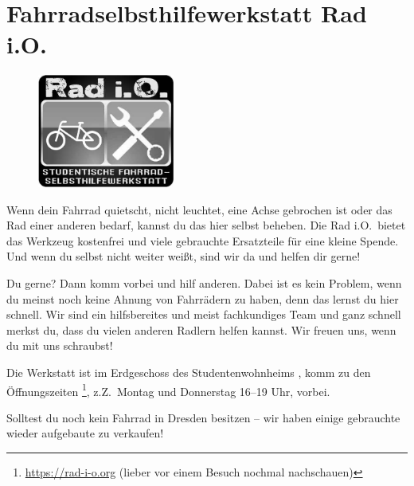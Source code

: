 \section*{Fahrradselbsthilfewerkstatt Rad i.O.}
\begin{figure}%
  \includegraphics[width=0.4\textwidth]{./radio-logo-gray.jpg}
\end{figure}
%
Wenn dein Fahrrad quietscht, nicht leuchtet, eine Achse gebrochen ist oder das Rad einer anderen  bedarf, kannst du das hier selbst beheben.
Die Rad i.O.\ bietet das Werkzeug kostenfrei und viele gebrauchte Ersatzteile für eine kleine Spende.
Und wenn du selbst nicht weiter weißt, sind wir da und helfen dir gerne!

Du  gerne? Dann komm vorbei und hilf anderen.
Dabei ist es kein Problem, wenn du meinst noch keine Ahnung von Fahrrädern zu haben,
denn das lernst du hier schnell.
Wir sind ein hilfsbereites und meist fachkundiges Team und ganz schnell merkst du,
dass du vielen anderen Radlern helfen kannst. Wir freuen uns, wenn du mit uns schraubst!

Die Werkstatt ist im Erdgeschoss des Studentenwohnheims , komm zu den Öffnungszeiten%
\footnote{\url{https://rad-i-o.org} (lieber vor einem Besuch nochmal nachschauen)}, z.Z.\ Montag und Donnerstag 16--19 Uhr, vorbei.

Solltest du noch kein Fahrrad in Dresden besitzen -- wir haben einige gebrauchte wieder aufgebaute zu verkaufen!
